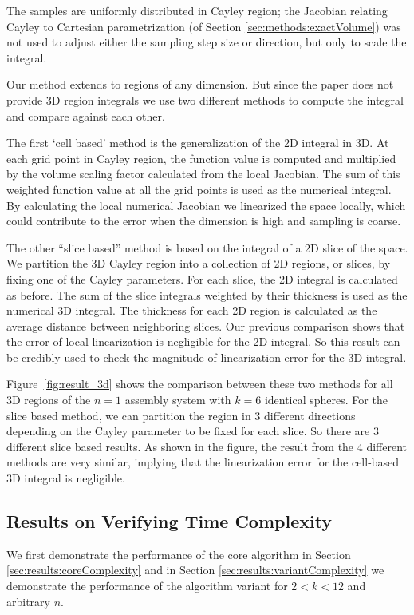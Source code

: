 \documentclass[]{article}
\newcommand{\figref}[1]{Figure~\ref{#1}}
\begin{document}
The samples are uniformly distributed in Cayley region; the Jacobian relating
Cayley to Cartesian parametrization (of Section \ref{sec:methods:exactVolume})
was not used to adjust either the sampling
step size or direction, but only to scale the integral.

Our method extends to regions of any dimension. But since the paper
\cite{Holmes-Cerfon2013} does not provide 3D region integrals we use two
different methods to compute the integral and compare against each other.

The first `cell based' method is the generalization of the 2D integral in 3D. At
each grid point in Cayley region, the function value is computed and multiplied
by the volume scaling factor calculated from the local Jacobian. The sum of
this weighted function value at all the grid points is used as the numerical integral.
By calculating the local numerical Jacobian we linearized the space locally, which
could contribute to the error when the dimension is high and sampling
is coarse.

The other ``slice based'' method is based on the integral of a 2D slice of the
space. We partition the 3D Cayley region into a collection of 2D regions, or
slices, by fixing one of the Cayley parameters. For each slice, the 2D integral
is calculated as before. The sum of the slice integrals weighted by
their thickness is used as the numerical 3D integral. The thickness for each
2D region is calculated as the average distance between neighboring slices. Our
previous comparison shows that the error of local linearization is
negligible for the 2D integral. So this result can be credibly used to check
the magnitude of linearization error for the 3D integral.

\figref{fig:result_3d} shows the comparison between these two methods for all
3D regions of the $n=1$ assembly system with $k=6$ identical spheres. For the slice
based method, we can partition the region in 3 different directions depending
on the Cayley parameter to be fixed for each slice. So there are 3 different
slice based results. As shown in the figure, the result from the 4 different
methods are very similar, implying that the linearization error for the cell-based
3D integral is negligible.

\subsection{Results on Verifying Time Complexity}
\label{sec:results:complexity}
We first demonstrate the performance of the core algorithm in 
Section \ref{sec:results:coreComplexity} and in Section \ref{sec:results:variantComplexity}
we demonstrate the performance of the algorithm variant for $2<k<12$ and arbitrary $n$.
\end{document}
